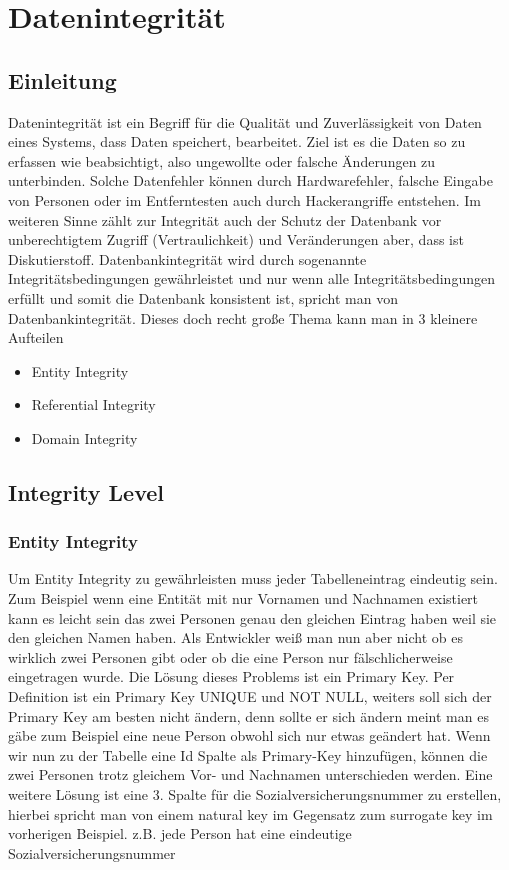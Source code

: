 \chapter{Datenintegrität}\label{cha:integrity}

\section{Einleitung}
Datenintegrität ist ein Begriff für die Qualität und Zuverlässigkeit von Daten eines Systems, dass Daten speichert, bearbeitet.
Ziel ist es die Daten so zu erfassen wie beabsichtigt, also ungewollte oder falsche Änderungen zu unterbinden.
Solche Datenfehler können durch Hardwarefehler, falsche Eingabe von Personen oder im Entferntesten auch durch Hackerangriffe entstehen.
Im weiteren Sinne zählt zur Integrität auch der Schutz der Datenbank vor unberechtigtem Zugriff (Vertraulichkeit) und Veränderungen aber, dass ist Diskutierstoff.
Datenbankintegrität wird durch sogenannte Integritätsbedingungen gewährleistet und nur wenn alle Integritätsbedingungen erfüllt und somit die Datenbank konsistent ist, spricht man von Datenbankintegrität.  
Dieses doch recht große Thema kann man in 3 kleinere Aufteilen

\begin{itemize}
  \item Entity Integrity
  \item Referential Integrity
  \item Domain Integrity 
\end{itemize}

\section{Integrity Level}
\subsection{Entity Integrity}

Um Entity Integrity zu gewährleisten muss jeder Tabelleneintrag eindeutig sein. 
Zum Beispiel wenn eine Entität mit nur Vornamen und Nachnamen existiert kann es leicht sein das zwei Personen genau den gleichen Eintrag haben weil sie den gleichen Namen haben. 
Als Entwickler weiß man nun aber nicht ob es wirklich zwei Personen gibt oder ob die eine Person nur fälschlicherweise eingetragen wurde. 
Die Lösung dieses Problems ist ein Primary Key. 
Per Definition ist ein Primary Key UNIQUE und NOT NULL, weiters soll sich der Primary Key am besten nicht ändern, denn sollte er sich ändern meint man es gäbe zum Beispiel eine neue Person obwohl sich nur etwas geändert hat. 
Wenn wir nun zu der Tabelle eine Id Spalte als Primary-Key hinzufügen, können die zwei Personen trotz gleichem Vor- und Nachnamen unterschieden werden. 
Eine weitere Lösung ist eine 3. Spalte für die Sozialversicherungsnummer zu erstellen, hierbei spricht man von einem natural key im Gegensatz zum surrogate key im vorherigen Beispiel.
z.B. jede Person hat eine eindeutige Sozialversicherungsnummer


